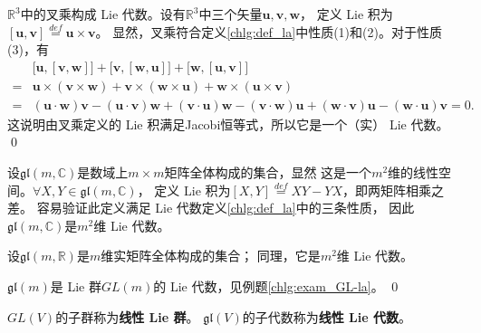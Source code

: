 \begin{example}
    $\mathbb{R}^3$中的叉乘构成 Lie 代数。设有$\mathbb{R}^3$中三个矢量$\boldsymbol{u},\boldsymbol{v},\boldsymbol{w}$，
    定义 Lie 积为$[\boldsymbol{u},\boldsymbol{v}]\overset{def}{=}\boldsymbol{u} \times \boldsymbol{v}$。
    显然，叉乘符合定义\ref{chlg:def_la}中性质(1)和(2)。对于性质(3)，有
    \begin{align*}
        &\bigl[\boldsymbol{u},[\boldsymbol{v},\boldsymbol{w}]\bigr]
        +\bigl[\boldsymbol{v},[\boldsymbol{w},\boldsymbol{u}]\bigr]+\bigl[\boldsymbol{w},
        [\boldsymbol{u},\boldsymbol{v}]\bigr] \\
      =& \boldsymbol{u} \times (\boldsymbol{v}\times \boldsymbol{w})+\boldsymbol{v} \times 
      (\boldsymbol{w}\times \boldsymbol{u})+\boldsymbol{w} \times (\boldsymbol{u}\times \boldsymbol{v}) \\
      =& (\boldsymbol{u}\cdot\boldsymbol{w}) \boldsymbol{v}  - (\boldsymbol{u}\cdot\boldsymbol{v}) \boldsymbol{w}
        +(\boldsymbol{v}\cdot\boldsymbol{u}) \boldsymbol{w}  - (\boldsymbol{v}\cdot\boldsymbol{w}) \boldsymbol{u}
        +(\boldsymbol{w}\cdot\boldsymbol{v}) \boldsymbol{u}  - (\boldsymbol{w}\cdot\boldsymbol{u}) \boldsymbol{v} = 0 .
    \end{align*}
    这说明由叉乘定义的 Lie 积满足Jacobi恒等式，所以它是一个（实） Lie 代数。 \qed
\end{example}

\begin{example}\label{chlg:exm_GL-a}
    设$\mathfrak{gl}(m,\mathbb{C})$是数域上$m\times m$矩阵全体构成的集合，显然
    这是一个$m^2$维的线性空间。$\forall X,Y\in \mathfrak{gl}(m,\mathbb{C})$，
    定义 Lie 积为$[X,Y]\overset{def}{=}XY-YX$，即两矩阵相乘之差。
    容易验证此定义满足 Lie 代数定义\ref{chlg:def_la}中的三条性质，
    因此$\mathfrak{gl}(m,\mathbb{C})$是$m^2$维 Lie 代数。
    
    设$\mathfrak{gl}(m,\mathbb{R})$是$m$维实矩阵全体构成的集合；
    同理，它是$m^2$维 Lie 代数。
    
    $\mathfrak{gl}(m)$是 Lie 群$GL(m)$的 Lie 代数，见例题\ref{chlg:exam_GL-la}。 \qed
\end{example}


 
\begin{definition}
    $GL(V)$的子群称为\textbf{线性 Lie 群}。
    $\mathfrak{gl}(V)$的子代数称为\textbf{线性 Lie 代数}。
\end{definition}

